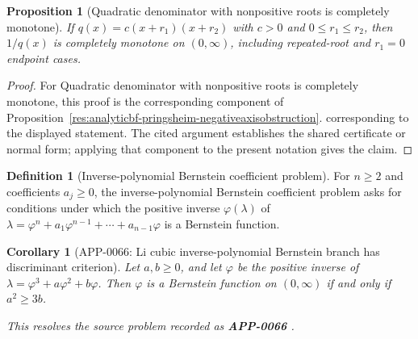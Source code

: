 \documentclass[11pt]{article}
\numberwithin{equation}{section}
\newtheorem{proposition}[theorem]{Proposition}
\newtheorem{corollary}[theorem]{Corollary}
\theoremstyle{definition}
\newtheorem{definition}{Definition}[section]
\theoremstyle{remark}
\newcommand{\1}{\mathbf 1}
\begin{document}
\begin{proposition}[Quadratic denominator with nonpositive roots is completely monotone]
\label{res:quadraticdenominator-cm-nonpositiveroots}
If \(q(x)=c(x+r_1)(x+r_2)\) with \(c>0\) and \(0\le r_1\le r_2\), then \(1/q(x)\) is completely monotone on \((0,\infty)\), including repeated-root and \(r_1=0\) endpoint cases.
\end{proposition}

\begin{proof}
For Quadratic denominator with nonpositive roots is completely monotone, this proof is the corresponding component of Proposition~\ref{res:analyticbf-pringsheim-negativeaxisobstruction}.  corresponding to the displayed statement.  The cited argument establishes the shared certificate or normal form; applying that component to the present notation gives the claim.
\end{proof}

\begin{definition}[Inverse-polynomial Bernstein coefficient problem]
\label{res:inversepolynomialbfproblem}
For \(n\ge2\) and coefficients \(a_j\ge0\), the inverse-polynomial Bernstein coefficient problem asks for conditions under which the positive inverse \(\varphi(\lambda)\) of \(\lambda=\varphi^n+a_1\varphi^{n-1}+\cdots+a_{n-1}\varphi\) is a Bernstein function.
\end{definition}

\begin{corollary}[APP-0066: Li cubic inverse-polynomial Bernstein branch has discriminant criterion]
\label{res:li-cubicinversepolynomial-bf-discriminant}
Let \(a,b\ge0\), and let \(\varphi\) be the positive inverse of \(\lambda=\varphi^3+a\varphi^2+b\varphi\). Then \(\varphi\) is a Bernstein function on \((0,\infty)\) if and only if \(a^2\ge3b\).



This resolves the source problem recorded as \textbf{APP-0066} \cite{app-app-0066-source}.
\end{corollary}
\end{document}

